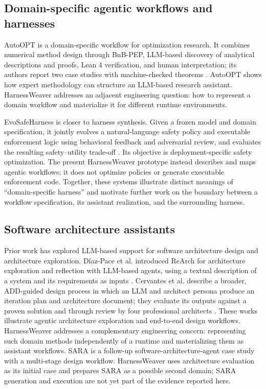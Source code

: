 \documentclass[10pt,conference]{IEEEtran}
\begin{document}
\subsection{Domain-specific agentic workflows and harnesses}

AutoOPT is a domain-specific workflow for optimization research. It combines numerical method design through BnB-PEP, LLM-based discovery of analytical descriptions and proofs, Lean 4 verification, and human interpretation; its authors report two case studies with machine-checked theorems \cite{autoopt}. AutoOPT shows how expert methodology can structure an LLM-based research assistant. HarnessWeaver addresses an adjacent engineering question: how to represent a domain workflow and materialize it for different runtime environments.

EvoSafeHarness is closer to harness synthesis. Given a frozen model and domain specification, it jointly evolves a natural-language safety policy and executable enforcement logic using behavioral feedback and adversarial review, and evaluates the resulting safety--utility trade-off \cite{evosafe}. Its objective is deployment-specific safety optimization. The present HarnessWeaver prototype instead describes and maps agentic workflows; it does not optimize policies or generate executable enforcement code. Together, these systems illustrate distinct meanings of ``domain-specific harness'' and motivate further work on the boundary between a workflow specification, its assistant realization, and the surrounding harness.

\subsection{Software architecture assistants}

Prior work has explored LLM-based support for software architecture design and architecture exploration. D\'iaz-Pace et al. introduced ReArch for architecture exploration and reflection with LLM-based agents, using a textual description of a system and its requirements as inputs \cite{rearch}. Cervantes et al. describe a broader, ADD-guided design process in which an LLM and architect persona produce an iteration plan and architecture document; they evaluate its outputs against a proven solution and through review by four professional architects \cite{bettertogether}. These works illustrate agentic architecture exploration and end-to-end design workflows. HarnessWeaver addresses a complementary engineering concern: representing such domain methods independently of a runtime and materializing them as assistant workflows. SARA is a follow-up software-architecture-agent case study with a multi-stage design workflow. HarnessWeaver uses architecture evaluation as its initial case and prepares SARA as a possible second domain; SARA generation and execution are not yet part of the evidence reported here.
\end{document}
